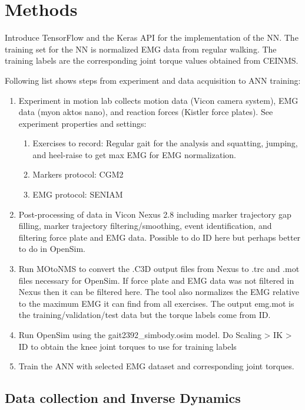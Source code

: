 \documentclass[../main.tex]{subfiles}
\begin{document}
\chapter{Methods}
Introduce TensorFlow and the Keras API for the implementation of the \ac{NN}.
The training set for the \ac{NN} is normalized EMG data from regular walking.
The training labels are the corresponding joint torque values obtained from CEINMS.

Following list shows steps from experiment and data acquisition to ANN training:
\begin{enumerate}
    \item Experiment in motion lab collects motion data (Vicon camera system), EMG data (myon aktos nano), and reaction forces (Kistler force plates). See experiment properties and settings:
    \begin{enumerate}
        \item Exercises to record: Regular gait for the analysis and squatting, jumping, and heel-raise to get max EMG for EMG normalization.
        \item Markers protocol: CGM2
        \item EMG protocol: SENIAM
    \end{enumerate}
    \item Post-processing of data in Vicon Nexus 2.8 including marker trajectory gap filling, marker trajectory filtering/smoothing, event identification, and filtering force plate and EMG data. Possible to do ID here but perhaps better to do in OpenSim.
    \item Run MOtoNMS to convert the .C3D output files from Nexus to .trc and .mot files necessary for OpenSim. If force plate and EMG data was not filtered in Nexus then it can be filtered here. The tool also normalizes the EMG relative to the maximum EMG it can find from all exercises. The output emg.mot is the training/validation/test data but the torque labels come from ID.
    \item Run OpenSim using the gait2392\_simbody.osim model. Do Scaling > IK > ID to obtain the knee joint torques to use for training labels
    \item Train the ANN with selected EMG dataset and corresponding joint torques.
\end{enumerate}



\section{Data collection and Inverse Dynamics}
\end{document}
